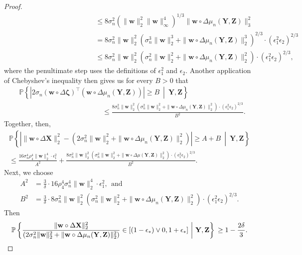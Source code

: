 \documentclass[12pt]{article}
\newcommand{\eps}{\varepsilon}
\newcommand{\PPst}[2]{\mathbb{P}\left\{{#1}\  \middle| \ {#2}\right\}}
\newcommand{\bX}{\mathbf{X}}
\newcommand{\bY}{\mathbf{Y}}
\newcommand{\bZ}{\mathbf{Z}}
\newcommand{\bw}{\mathbf{w}}
\newcommand{\bzeta}{\mathbf{\eps}}
\def\bzeta{{\boldsymbol{\zeta}}}
\begin{document}
\begin{proof}
\begin{align*}
&\hspace{5cm}\leq  8\sigma_n^2 \left(\|\bw\|^2_2\|\bw\|^4_\infty\right)^{1/3}\|\bw\circ\Delta\mu_n(\bY,\bZ)\|_3^2 \\
&\hspace{5cm}=  8\sigma_n^2 \|\bw\|^2_2\left(\sigma_n^3\|\bw\|^3_2 + \|\bw\circ\Delta\mu_n(\bY,\bZ)\|^3_2\right)^{2/3} \cdot(\epsilon_1^2\epsilon_2)^{2/3}\\
&\hspace{5cm}\leq  8\sigma_n^2 \|\bw\|^2_2 \left(\sigma_n^2\|\bw\|^2_2 +  \|\bw\circ\Delta\mu_n(\bY,\bZ)\|^2_2\right)\cdot(\epsilon_1^2\epsilon_2)^{2/3},
\end{align*}
where the penultimate step uses the definitions of $\epsilon_1^2$ and $\epsilon_2$.  Another application of Chebyshev's inequality then gives us for every $B > 0$ that
\begin{align*}
&\PPst{\left|2\sigma_n(\bw\circ \Delta\bzeta)^\top (\bw\circ \Delta\mu_n(\bY,\bZ)) \right|\geq   B}{\bY,\bZ} \\
&\hspace{5cm}\leq \frac{ 8\sigma_n^2 \|\bw\|^2_2 \left(\sigma_n^2\|\bw\|^2_2 +  \|\bw\circ\Delta\mu_n(\bY,\bZ)\|^2_2\right)\cdot(\epsilon_1^2\epsilon_2)^{2/3} }{B^2}.
\end{align*}
Together, then,
\begin{multline*}
\PPst{\left|\|\bw\circ \Delta\bX\|^2_2 -  \left(2\sigma_n^2\|\bw\|^2_2 +   \|\bw\circ \Delta\mu_n(\bY,\bZ)\|^2_2\right)\right| \geq  A + B}{\bY,\bZ}\\ \leq \frac{16\sigma_n^4\rho^4_4\|\bw\|^4_2\cdot \epsilon_1^2}{A^2} +\frac{ 8\sigma_n^2 \|\bw\|^2_2 \left(\sigma_n^2\|\bw\|^2_2 +  \|\bw\circ\Delta\mu(\bY,\bZ)\|^2_2\right)\cdot(\epsilon_1^2\epsilon_2)^{2/3} }{B^2}. \end{multline*}
Next, we choose 
\begin{align*}
    A^2 &= \frac{3}{\delta}\cdot  16\rho^4_4\sigma_n^4\|\bw\|^4_2\cdot \epsilon_1^2,~~\text{and}\\
    B^2 &=\frac{3}{\delta} \cdot  8\sigma_n^2 \|\bw\|^2_2 \left(\sigma_n^2\|\bw\|^2_2 +  \|\bw\circ\Delta\mu_n(\bY,\bZ)\|^2_2\right)\cdot(\epsilon_1^2\epsilon_2)^{2/3}.
\end{align*}
Then 
\[
\PPst{\frac{\|\bw\circ \Delta\bX\|^2_2}{\left(2\sigma_n^2\|\bw\|^2_2 +   \|\bw\circ \Delta\mu_n(\bY,\bZ)\|^2_2\right)}\in [(1 -\epsilon_*) \vee 0,1+\epsilon_*]}{\bY,\bZ}\\ \geq 1-\frac{2\delta}{3}.
\]


\end{proof}
\end{document}

